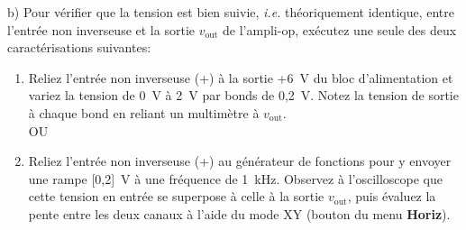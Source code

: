 \documentclass[canadien,12pt,oneside,letterpaper]{article}
\begin{document}
b) Pour vérifier que la tension est bien suivie, \textit{i.e.} théoriquement identique, entre l'entrée non inverseuse et la sortie $v_{\mathrm{out}}$ de l'ampli-op, exécutez une seule des deux caractérisations suivantes:
\begin{enumerate}
    \item Reliez l'entrée non inverseuse (+) à la sortie +6~V du bloc d'alimentation et variez la tension de 0~V à 2~V par bonds de 0,2~V. Notez la tension de sortie à chaque bond en reliant un multimètre à $v_{\mathrm{out}}$.\\[0.8ex]
    OU
    \item Reliez l'entrée non inverseuse (+) au générateur de fonctions pour y envoyer une rampe [0,2]~V à une fréquence de 1~kHz. Observez à l'oscilloscope que cette tension en entrée se superpose à celle à la sortie $v_{\mathrm{out}}$, puis évaluez la pente entre les deux canaux à l'aide du mode XY (bouton du menu \textbf{Horiz}).
\end{enumerate}





\end{document}
